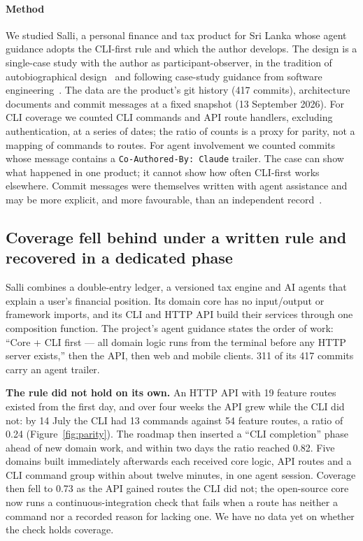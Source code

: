 \documentclass[sigconf,nonacm]{acmart}
\newcommand{\sysA}{Salli}
\newcommand{\finding}[1]{\textbf{#1}}
\begin{document}
\paragraph{Method}
We studied \sysA{}, a personal finance and tax product for Sri Lanka whose agent guidance adopts the CLI-first rule and which the author develops. The design is a single-case study with the author as participant-observer, in the tradition of autobiographical design~\cite{neustaedter2012autobiographical} and following case-study guidance from software engineering~\cite{runeson2009case}. The data are the product's git history (417 commits), architecture documents and commit messages at a fixed snapshot (13 September 2026). For CLI coverage we counted CLI commands and API route handlers, excluding authentication, at a series of dates; the ratio of counts is a proxy for parity, not a mapping of commands to routes. For agent involvement we counted commits whose message contains a \texttt{Co-Authored-By: Claude} trailer. The case can show what happened in one product; it cannot show how often CLI-first works elsewhere. Commit messages were themselves written with agent assistance and may be more explicit, and more favourable, than an independent record~\cite{bird2009git}.

\subsection{Coverage fell behind under a written rule and recovered in a dedicated phase}
\sysA{} combines a double-entry ledger, a versioned tax engine and AI agents that explain a user's financial position. Its domain core has no input/output or framework imports, and its CLI and HTTP API build their services through one composition function. The project's agent guidance states the order of work: ``Core + CLI first --- all domain logic runs from the terminal before any HTTP server exists,'' then the API, then web and mobile clients. 311 of its 417 commits carry an agent trailer.

\finding{The rule did not hold on its own.} An HTTP API with 19 feature routes existed from the first day, and over four weeks the API grew while the CLI did not: by 14 July the CLI had 13 commands against 54 feature routes, a ratio of 0.24 (Figure~\ref{fig:parity}). The roadmap then inserted a ``CLI completion'' phase ahead of new domain work, and within two days the ratio reached 0.82. Five domains built immediately afterwards each received core logic, API routes and a CLI command group within about twelve minutes, in one agent session. Coverage then fell to 0.73 as the API gained routes the CLI did not; the open-source core now runs a continuous-integration check that fails when a route has neither a command nor a recorded reason for lacking one. We have no data yet on whether the check holds coverage.
\end{document}
